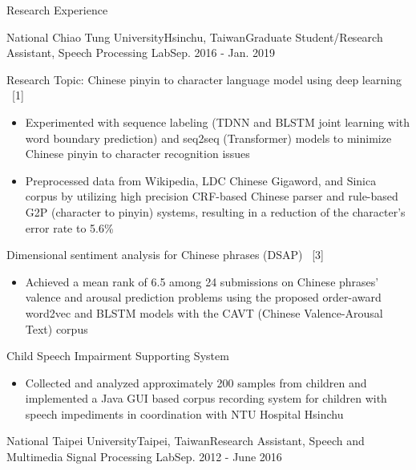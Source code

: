 \documentclass{resume} %
\begin{document}
\begin{rSection}{Research Experience}
    \begin{rSubsection}{National Chiao Tung University}{Hsinchu, Taiwan}{Graduate Student/Research Assistant, Speech Processing Lab}{Sep. 2016 - Jan. 2019}
        \item Research Topic: Chinese pinyin to character language model using deep learning ~[1]
        \begin{itemize}[label=$-$]
            \setlength \itemsep{-0.5em}
            \item Experimented with sequence labeling (TDNN and BLSTM joint learning with word boundary prediction) and seq2seq (Transformer) models to minimize Chinese pinyin to character recognition issues
            \item Preprocessed data from Wikipedia, LDC Chinese Gigaword, and Sinica corpus by utilizing high precision CRF-based Chinese parser and rule-based G2P (character to pinyin) systems, resulting in a reduction of the character’s error rate to 5.6\%
        \end{itemize}\vspace {0.5em}
        \item Dimensional sentiment analysis for Chinese phrases (DSAP) ~[3] 
        \begin{itemize}[label=$-$]
            \setlength \itemsep{-0.5em}
            \item Achieved a mean rank of 6.5 among 24 submissions on Chinese phrases’ valence and arousal prediction problems using the proposed order-award word2vec and BLSTM models with the CAVT (Chinese Valence-Arousal Text) corpus
        \end{itemize}\vspace {0.5em}
        \item Child Speech Impairment Supporting System
        \begin{itemize}[label=$-$]
            \setlength \itemsep{-0.5em}
            \item Collected and analyzed approximately 200 samples from children and implemented a Java GUI based corpus recording system for children with speech impediments in coordination with NTU Hospital Hsinchu
        \end{itemize}\vspace {0.5em}
    \end{rSubsection}
    \begin{rSubsection}{National Taipei University}{Taipei, Taiwan}{Research Assistant, Speech and Multimedia Signal Processing Lab}{Sep. 2012 - June 2016}

\end{rSubsection}
\end{rSection}
\end{document}
